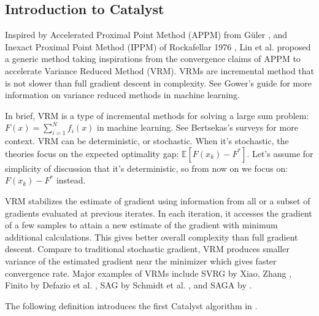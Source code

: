 \documentclass[12pt]{article}
\begin{document}
    \subsection{Introduction to Catalyst}\label{ssec:catalyst-intro}
        Inspired by Accelerated Proximal Point Method (APPM) from Güler \cite{guler_new_1992}, and Inexact Proximal Point Method (IPPM) of Rockafellar 1976 \cite{rockafellar_monotone_1976}, Lin et al. \cite{lin_universal_2015} proposed a generic method taking inspirations from the convergence claims of APPM to accelerate Variance Reduced Method (VRM). 
        VRMs are incremental method that is not slower than full gradient descent in complexity. 
        See Gower's guide \cite{gower_variance-reduced_2020} for more information on variance reduced methods in machine learning. 
        \par
        In brief, VRM is a type of incremental methods for solving a large sum problem: $F(x) = \sum_{i = 1}^{N} f_i(x)$ in machine learning.
        See Bertsekas's surveys \cite{bertsekas_incremental_2011,Bertsekas_incremental_2017} for more context. 
        VRM can be deterministic, or stochastic. 
        When it's stochastic, the theories focus on the expected optimality gap: $\mathbb E[F(x_k) - F^*]$. 
        Let's assume for simplicity of discussion that it's deterministic, so from now on we focus on: $F(x_k) - F^*$ instead. 
        \par 
        VRM stabilizes the estimate of gradient using information from all or a subset of gradients evaluated at previous iterates. 
        In each iteration, it accesses the gradient of a few samples to attain a new estimate of the gradient with minimum additional calculations.  
        This gives better overall complexity than full gradient descent. 
        Compare to traditional stochastic gradient, VRM produces smaller variance of the estimated gradient near the minimizer which gives faster convergence rate. 
        Major examples of VRMs include SVRG by Xiao, Zhang \cite{xiao_proximal_2014}, Finito by Defazio et al. \cite{defazio_finito_2014}, SAG by Schmidt et al. \cite{schmidt_minimizing_2017}, and SAGA by \cite{defazio_saga_2014}. 
        \par
        The following definition introduces the first Catalyst algorithm in \cite{lin_universal_2015}. 
\end{document}
